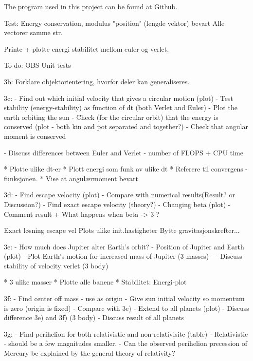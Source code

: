 


The program used in this project can be found at \href{https://github.com/kjetka/Project3}{Github}. 




Test: 		
Energy conservation, modulus "position" (lengde vektor) bevart
				Alle vectorer samme str.



	Printe + plotte energi stabilitet mellom euler og verlet.


To do:
	OBS Unit tests
	
	3b:
								Forklare objektorientering, hvorfor deler kan generaliseres. 
	
	3c: 					  
	- Find out which initial velocity that gives a circular motion (plot)
	- Test stability (energy-stability) as function of dt (both Verlet and Euler)
	- Plot the earth orbiting the sun
	- Check (for the circular orbit) that the energy is conserved (plot - both kin and pot separated and together?)
	- Check that angular moment is conserved
	
	- Discuss differences between Euler and Verlet
		- number of FLOPS + CPU time
	
	
 * Plotte ulike dt-er
 * Plott energi som funk av ulike dt
 * Referere til convergens - funksjonen.
 * Vise at angulærmoment bevart

	3d: 	
	- Find escape velocity (plot)
	 	- Compare with numerical results(Result? or Discussion?)
	- Find exact escape velocity (theory?)
	- Changing beta (plot)
		- Comment result + What happens when beta -> 3 ?
	
					  Exact løsning escape vel
								Plots ulike init.hastigheter
								Bytte gravitasjonskrefter... 
								
	3e:
	- How much does Jupiter alter Earth's orbit?
	- Position of Jupiter and Earth (plot)	
	- Plot Earth's motion for increased mass of Jupiter (3 masses)
	- 
	- Discuss stability of velocity verlet (3 body)

 * 3 ulike masser
 * Plotte alle banene
 * Stabilitet: Energi-plot

	3f:
	- Find center off mass - use as origin
	- Give sun initial velocity so momentum is zero (origin is fixed)
	- Compare with 3e)
	- Extend to all planets (plot)
	- Discuss difference 3e) and 3f) (3 body)
	- Discuss result of all planets
	
	3g:
	- 	Find perihelion for both relativistic and non-relativisitc (table)
	- Relativistic - should be a few magnitudes smaller.	
	-  Can the observed perihelion
precession of Mercury be explained by the general theory of relativity?
	
